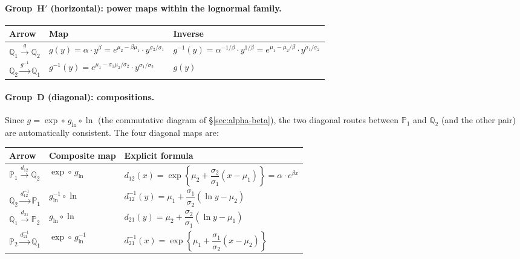 \documentclass[11pt,a4paper]{article}
\begin{document}
\paragraph{Group~H$'$ (horizontal): power maps within the lognormal family.}

\begin{center}
\renewcommand{\arraystretch}{1.6}
\begin{tabular}{lll}
\toprule
Arrow & Map & Inverse \\
\midrule
$\mathbb{Q}_1\xrightarrow{g}\mathbb{Q}_2$
  & $g(y)=\alpha\cdot y^\beta=e^{\mu_2-\beta\mu_1}\cdot y^{\sigma_2/\sigma_1}$
  & $g^{-1}(y)=\alpha^{-1/\beta}\cdot y^{1/\beta}
              =e^{\mu_1-\mu_2/\beta}\cdot y^{\sigma_1/\sigma_2}$ \\[4pt]
$\mathbb{Q}_2\xrightarrow{g^{-1}}\mathbb{Q}_1$
  & $g^{-1}(y)=e^{\mu_1-\sigma_1\mu_2/\sigma_2}\cdot y^{\sigma_1/\sigma_2}$
  & $g(y)$ \\
\bottomrule
\end{tabular}
\end{center}

\paragraph{Group~D (diagonal): compositions.}

Since $g=\exp\circ\, g_{\ln}\circ\ln$ (the commutative diagram of \S\ref{sec:alpha-beta}),
the two diagonal routes between $\mathbb{P}_1$ and $\mathbb{Q}_2$ (and the other pair) are
automatically consistent.  The four diagonal maps are:

\begin{center}
\renewcommand{\arraystretch}{1.6}
\begin{tabular}{lll}
\toprule
Arrow & Composite map & Explicit formula \\
\midrule
$\mathbb{P}_1\xrightarrow{d_{12}}\mathbb{Q}_2$
  & $\exp\circ\, g_{\ln}$
  & $d_{12}(x)=\exp\!\left\{\mu_2+\dfrac{\sigma_2}{\sigma_1}(x-\mu_1)\right\}
              =\alpha\cdot e^{\beta x}$ \\[4pt]
$\mathbb{Q}_2\xrightarrow{d_{12}^{-1}}\mathbb{P}_1$
  & $g_{\ln}^{-1}\circ\ln$
  & $d_{12}^{-1}(y)=\mu_1+\dfrac{\sigma_1}{\sigma_2}(\ln y-\mu_2)$ \\[6pt]
$\mathbb{Q}_1\xrightarrow{d_{21}}\mathbb{P}_2$
  & $g_{\ln}\circ\ln$
  & $d_{21}(y)=\mu_2+\dfrac{\sigma_2}{\sigma_1}(\ln y-\mu_1)$ \\[4pt]
$\mathbb{P}_2\xrightarrow{d_{21}^{-1}}\mathbb{Q}_1$
  & $\exp\circ\, g_{\ln}^{-1}$
  & $d_{21}^{-1}(x)=\exp\!\left\{\mu_1+\dfrac{\sigma_1}{\sigma_2}(x-\mu_2)\right\}$ \\
\bottomrule
\end{tabular}
\end{center}
\end{document}

